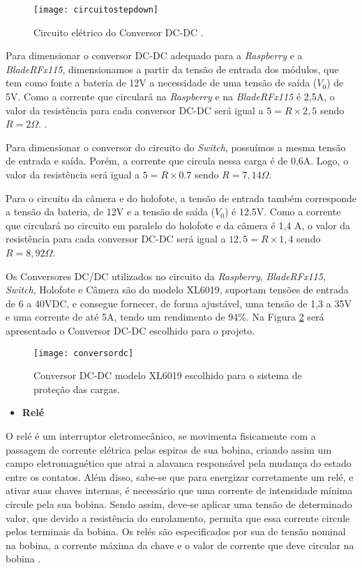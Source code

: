 \begin{figure}[H]
\centering
\texttt{[image: circuitostepdown]}
    \caption{Circuito elétrico do Conversor DC-DC \cite{Amauri}.}
\label{fig:circuitostepdown}
\end{figure}


Para dimensionar o conversor DC-DC adequado para a \textit{Raspberry} e a \textit{BladeRFx115}, dimensionamos a partir da tensão de entrada dos módulos, que tem como fonte a bateria de 12V a necessidade de uma tensão de saída ($V_0$) de 5V. Como a corrente que circulará na \textit{Raspberry} e na \textit{BladeRFx115} é 2,5A, o valor da resistência para cada conversor DC-DC será igual a $5=R \times 2,5$ sendo $R= 2 \Omega$. \cite{MSM}.

Para dimensionar o conversor do circuito do \textit{Switch}, possuímos a mesma tensão de entrada e saída. Porém, a corrente que circula nessa carga é de 0,6A. Logo, o valor da resistência será igual a $5=R \times 0.7$ sendo $R= 7,14 \Omega$.

Para o circuito da câmera e do holofote, a tensão de entrada também corresponde a tensão da bateria, de 12V e a tensão de saída ($V_0$) é 12.5V. Como a corrente que circulará no circuito em paralelo do holofote e da câmera é 1,4 A, o valor da resistência para cada conversor DC-DC será igual a $12,5=R \times 1,4$ sendo $R= 8,92 \Omega$.

Os Conversores DC/DC utilizados no circuito da \textit{Raspberry}, \textit{BladeRFx115}, \textit{Switch}, Holofote e Câmera são do modelo XL6019, suportam tensões de entrada de 6 a 40VDC, e consegue fornecer, de forma ajustável, uma tensão de 1,3 a 35V e uma corrente de até 5A, tendo um rendimento de 94\%. Na Figura \ref{fig:conversordc} será apresentado o Conversor DC-DC escolhido para o projeto.


\begin{figure}[H]
\centering
\texttt{[image: conversordc]}
    \caption{Conversor DC-DC modelo XL6019 escolhido para o sistema de proteção das cargas.}
\label{fig:conversordc}
\end{figure}
\FloatBarrier


\begin{itemize}

    \item \textbf{Relé}
    
\end{itemize}

O relé é um interruptor eletromecânico, se movimenta fisicamente com a passagem de corrente elétrica pelas espiras de sua bobina, criando assim um campo eletromagnético que atrai a alavanca responsável pela mudança do estado entre os contatos. Além disso, sabe-se que para energizar corretamente um relé, e ativar suas chaves internas, é necessário que uma corrente de intensidade mínima circule pela sua bobina. Sendo assim, deve-se aplicar uma tensão de determinado valor, que devido a resistência do enrolamento, permita que essa corrente circule pelos terminais da bobina. Os relés são especificados por sua de tensão nominal na bobina, a corrente máxima da chave e o valor de corrente que deve circular na bobina \cite{Braga}.

